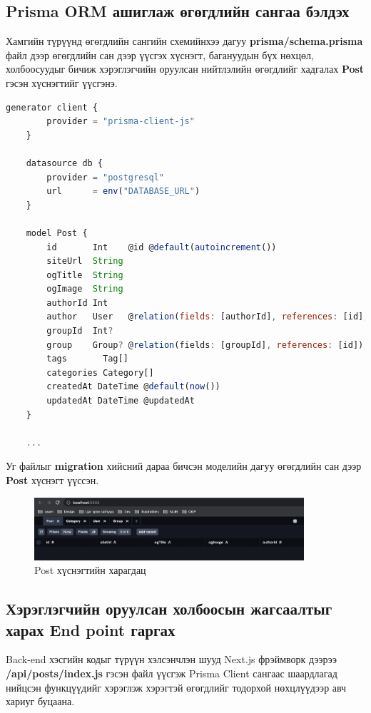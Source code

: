 \subsection{Prisma ORM ашиглаж өгөгдлийн сангаа бэлдэх}

Хамгийн түрүүнд өгөгдлийн сангийн схемийнхээ дагуу \textbf{prisma/schema.prisma} файл дээр өгөгдлийн сан дээр үүсгэх хүснэгт, багануудын бүх нөхцөл, холбоосуудыг бичиж хэрэглэгчийн оруулсан нийтлэлийн өгөгдлийг хадгалах \textbf{Post} гэсэн хүснэгтийг үүсгэнэ.

\begin{lstlisting}[language=Javascript, caption=Өгөгдлийн сангийн хүснэгтийг Prisma ашиглан үүсгэх, frame=single]
	generator client {
		provider = "prisma-client-js"
	}
	
	datasource db {
		provider = "postgresql"
		url      = env("DATABASE_URL")
	}
	
	model Post {
		id       Int    @id @default(autoincrement())
		siteUrl  String
		ogTitle  String
		ogImage  String
		authorId Int
		author   User   @relation(fields: [authorId], references: [id], onDelete: Cascade)
		groupId  Int?
		group    Group? @relation(fields: [groupId], references: [id])
		tags       Tag[]
		categories Category[]
		createdAt DateTime @default(now())
		updatedAt DateTime @updatedAt
	}	

	...

\end{lstlisting}

Уг файлыг \textbf{migration} хийсний дараа бичсэн моделийн дагуу өгөгдлийн сан дээр \textbf{Post} хүснэгт үүссэн. 

\begin{figure}[h]
	\centering
	\includegraphics[width=10cm]{images/implement/table.png}
	\caption{Post хүснэгтийн харагдац}
	\label{fig:table}
\end{figure}

\subsection{Хэрэглэгчийн оруулсан холбоосын жагсаалтыг харах End point гаргах}

Back-end хэсгийн кодыг түрүүн хэлсэнчлэн шууд Next.js фрэймворк дээрээ \textbf{/api/posts/index.js} гэсэн файл үүсгэж Prisma Client сангаас шаардлагад нийцсэн функцүүдийг хэрэглэж хэрэгтэй өгөгдлийг тодорхой нөхцлүүдээр авч хариуг буцаана.

